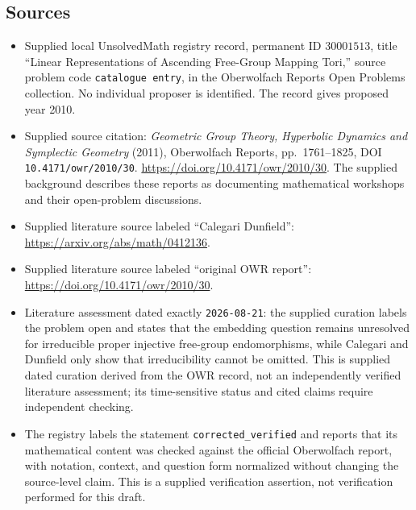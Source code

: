 \documentclass[11pt]{article}
\begin{document}
\subsection{Sources}
\begin{itemize}
\item Supplied local UnsolvedMath registry record, permanent ID \(30001513\), title ``Linear Representations of Ascending Free-Group Mapping Tori,'' source problem code \texttt{catalogue entry}, in the Oberwolfach Reports Open Problems collection. No individual proposer is identified. The record gives proposed year 2010.
\item Supplied source citation: \emph{Geometric Group Theory, Hyperbolic Dynamics and Symplectic Geometry} (2011), Oberwolfach Reports, pp.\ 1761--1825, DOI \texttt{10.4171/owr/2010/30}. \url{https://doi.org/10.4171/owr/2010/30}. The supplied background describes these reports as documenting mathematical workshops and their open-problem discussions.
\item Supplied literature source labeled ``Calegari Dunfield'': \url{https://arxiv.org/abs/math/0412136}.
\item Supplied literature source labeled ``original OWR report'': \url{https://doi.org/10.4171/owr/2010/30}.
\item Literature assessment dated exactly \texttt{2026-08-21}: the supplied curation labels the problem open and states that the embedding question remains unresolved for irreducible proper injective free-group endomorphisms, while Calegari and Dunfield only show that irreducibility cannot be omitted. This is supplied dated curation derived from the OWR record, not an independently verified literature assessment; its time-sensitive status and cited claims require independent checking.
\item The registry labels the statement \texttt{corrected\_verified} and reports that its mathematical content was checked against the official Oberwolfach report, with notation, context, and question form normalized without changing the source-level claim. This is a supplied verification assertion, not verification performed for this draft.
\end{itemize}
\end{document}
